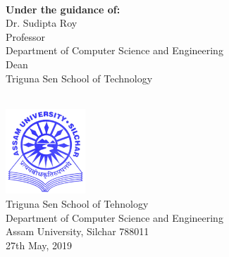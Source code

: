 \documentclass[10pt, oneside]{Thesis} %
\begin{document}
\begin{titlepage}
\begin{center}
\begin{minipage}[t]{0.8\textwidth}
\end{minipage}
\\[0.8cm]
\begin{minipage}[t]{0.8\textwidth}
\begin{center} \large
\textbf{Under the guidance of:} \\
{Dr. Sudipta Roy}\\Professor\\Department of Computer Science and Engineering\\Dean\\Triguna Sen School of Technology
\end{center}
\end{minipage}\\[1cm]
 {
\includegraphics[width=3cm]{Logo.png} \\%
Triguna Sen School of Tehnology\\ 
Department of Computer Science and Engineering\\ %
Assam University, Silchar 788011 \\
\large 27th May, 2019}\\[1cm] %
\end{center}

\end{titlepage}
\end{document}
